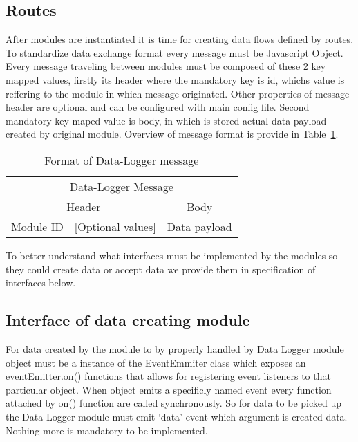 \subsection{Routes} %
\label{sub:routes}
After modules are instantiated it is time for creating data flows defined by routes. To standardize data exchange format every message must be Javascript Object. Every message traveling between modules must be composed of these 2 key mapped values, firstly its header where the mandatory key is id, whichs value is reffering to the module in which message originated. Other properties of message header are optional and can be configured with main config file. Second mandatory key maped value is body, in which is stored actual data payload created by original module. Overview of message format is provide in Table~\ref{tab:tab7}.
\begin{table}[H]
 \begin{center}
   \begin{tabular}{l l l l}
   \toprule
   \multicolumn{4}{c}{Data-Logger Message}\\
   \multicolumn{2}{c}{Header} & \multicolumn{2}{c}{Body} \\
   \midrule
   Module ID & [Optional values] & \multicolumn{2}{c}{Data payload}\\   
   \end{tabular}
 \end{center}
 \caption{Format of Data-Logger message}
 \label{tab:tab7}
\end{table}
To better understand what interfaces must be implemented by the modules so they could create data or accept data we provide them in specification of interfaces below.
\subsection{Interface of data creating module} %
\label{ssub:interface_of_data_creating_module}
For data created by the module to by properly handled by Data Logger module object must be a instance of the EventEmmiter class which exposes an eventEmitter.on() functions that allows for registering event listeners to that particular object. When object emits a specificly named event every function attached by on() function are called synchronously. So for data to be picked up the Data-Logger module must emit `data' event which argument is created data. Nothing more is mandatory to be implemented.

